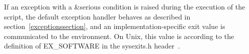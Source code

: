 If an exception with a {\cf\&serious} condition is raised during the
execution of the script, the default exception handler behaves as
described in section~\ref{exceptionssection}, and an
implementation-specific exit value is communicated to the
environment.  On Unix, this value is according to the definition of
{\cf EX\_SOFTWARE} in the {\cf sysexits.h} header~\cite{srfi22}.

